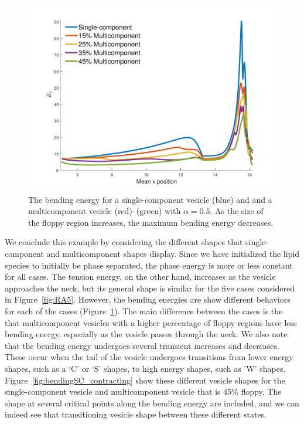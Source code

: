 \documentclass[twoside,twocolumn,9pt]{article}
\begin{document}
\begin{figure}[H]
    \centering
    \includegraphics[width=\columnwidth]{figures/bendingAllContracting.pdf}
    \caption{\small The bending energy for a single-component vesicle (blue) and and a multicomponent vesicle (red)--(green) with $\alpha = 0.5$. As the size of the floppy region increases, the maximum bending energy decreases.}
    \label{fig:bendingAll}
\end{figure}

We conclude this example by considering the different shapes that single-component and multicomponent shapes display. Since we have initialized the lipid species to initially be phase separated, the phase energy is more or less constant for all cases. The tension energy, on the other hand, increases as the vesicle approaches the neck, but its general shape is similar for the five cases considered in Figure~\ref{fig:RA5}. However, the bending energies are show different behaviors for each of the cases (Figure~\ref{fig:bendingAll}). The main difference between the cases is the that multicomponent vesicles with a higher percentage of floppy regions have less bending energy, especially as the vesicle passes through the neck. We also note that the bending energy undergoes several transient increases and decreases. These occur when the tail of the vesicle undergoes transitions from lower energy shapes, such as a `C' or `S' shapes, to high energy shapes, such as 'W' shapes. Figure~\ref{fig:bendingSC_contracting} show these different vesicle shapes for the single-component vesicle and multicomponent vesicle that is 45\% floppy. The shape at several critical points along the bending energy are included, and we can indeed see that transitioning vesicle shape between these different states.
\end{document}

